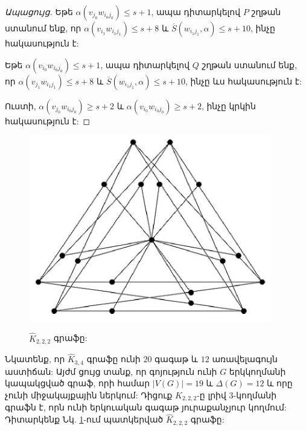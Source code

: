 \begin{proof}[Ապացույց]
Եթե $\alpha(v_{j_{0}}w_{i_{0}j_{0}})\leq s+1$, ապա դիտարկելով $P$ շղթան ստանում ենք, որ $\alpha(v_{i_{1}}w_{i_{1}j_{1}})\leq s+8$ և
$\overline{S}(w_{i_{1}j_{1}},\alpha)\leq s+10$, ինչը հակասություն է:

Եթե $\alpha(v_{i_{0}}w_{i_{0}j_{0}})\leq s+1$, ապա դիտարկելով $Q$ շղթան ստանում ենք, որ $\alpha(v_{j_{1}}w_{i_{1}j_{1}})\leq s+8$ և
$\overline{S}(w_{i_{1}j_{1}},\alpha)\leq s+10$, ինչը ևս հակասություն է:

Ուստի, $\alpha(v_{j_{0}}w_{i_{0}j_{0}})\geq s+2$ և
$\alpha(v_{i_{0}}w_{i_{0}j_{0}})\geq s+2$, ինչը կրկին հակասություն է:
\end{proof}

\begin{figure}[h]
\begin{center}
\includegraphics[width=25pc]{figures/K222.eps}\\
\caption{$\widehat{K}_{2,2,2}$ գրաֆը:}\label{f3_K222}
\end{center}
\end{figure}

Նկատենք, որ $\widehat{K}_{3,4}$ գրաֆը ունի $20$ գագաթ և $12$ առավելագույն աստիճան: Այժմ ցույց տանք, որ գոյություն ունի $G$ երկկողմանի կապակցված գրաֆ, որի համար $\vert V(G)\vert =19$ և $\Delta(G)=12$ և որը չունի միջակայքային ներկում: Դիցուք $K_{2,2,2}$-ը լրիվ $3$-կողմանի գրաֆն է, որն ունի երկուական գագաթ յուրաքանչյուր կողմում: Դիտարկենք Նկ. \ref{f3_K222}-ում պատկերված $\widehat{K}_{2,2,2}$ գրաֆը:

